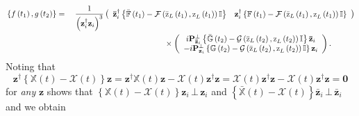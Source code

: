 \documentclass[aps,preprint]{revtex4}%
\begin{document}
\begin{align}
&  \left\{  f\left(  t_{1}\right)  ,g\left(  t_{2}\right)  \right\}
=\quad\frac{1}{\left(  \mathbf{z}_{i}^{\dagger}\mathbf{z}_{i}\right)  ^{3}%
}\left(
\begin{array}
[c]{cc}%
\mathbf{\bar{z}}_{i}^{\dagger}\left\{  \mathbb{\bar{F}}\left(  t_{1}\right)
-\mathcal{F}\left(  \mathrm{\bar{z}}_{L}\left(  t_{1}\right)  \mathrm{,z}%
_{L}\left(  t_{1}\right)  \right)  \mathbb{I}\right\}  & \mathbf{z}%
_{i}^{\dagger}\left\{  \mathbb{F}\left(  t_{1}\right)  -\mathcal{F}\left(
\mathrm{\bar{z}}_{L}\left(  t_{1}\right)  \mathrm{,z}_{L}\left(  t_{1}\right)
\right)  \mathbb{I}\right\}
\end{array}
\right) \nonumber\\
&  \qquad\qquad\qquad\qquad\qquad\qquad\qquad\qquad\qquad\qquad\times\left(
\begin{array}
[c]{c}%
i\mathbf{P}_{\mathbf{\bar{z}}_{i}}^{\bot}\left\{  \mathbb{\bar{G}}\left(
t_{2}\right)  -\mathcal{G}\left(  \mathrm{\bar{z}}_{L}\left(  t_{2}\right)
\mathrm{,z}_{L}\left(  t_{2}\right)  \right)  \mathbb{I}\right\}
\mathbf{\bar{z}}_{i}\\
-i\mathbf{P}_{\mathbf{z}_{i}}^{\bot}\left\{  \mathbb{G}\left(  t_{2}\right)
-\mathcal{G}\left(  \mathrm{\bar{z}}_{L}\left(  t_{2}\right)  \mathrm{,z}%
_{L}\left(  t_{2}\right)  \right)  \mathbb{I}\right\}  \mathbf{z}_{i}%
\end{array}
\right)  .
\end{align}
Noting that
\begin{equation}
\mathbf{z}^{\dagger}\left\{  \mathbb{X}\left(  t\right)  -\mathcal{X}\left(
t\right)  \right\}  \mathbf{z=z}^{\dagger}\mathbb{X}\left(  t\right)
\mathbf{z}-\mathcal{X}\left(  t\right)  \mathbf{z}^{\dagger}\mathbf{z}%
=\mathcal{X}\left(  t\right)  \mathbf{z}^{\dagger}\mathbf{z-}\mathcal{X}%
\left(  t\right)  \mathbf{z}^{\dagger}\mathbf{z=0}%
\end{equation}
for \emph{any }$\mathbf{z}$ shows that $\left\{  \mathbb{X}\left(  t\right)
-\mathcal{X}\left(  t\right)  \right\}  \mathbf{z}_{i}\mathbf{\,\bot\,z}_{i}$
and $\left\{  \mathbb{\bar{X}}\left(  t\right)  -\mathcal{X}\left(  t\right)
\right\}  \mathbf{\bar{z}}_{i}\mathbf{\,\bot\,\bar{z}}_{i}$ and we obtain
\end{document}
